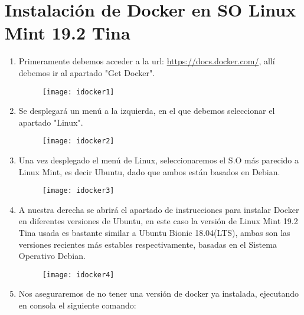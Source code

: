 \documentclass[10pt,letterpaper]{article}
\begin{document}
\newpage
\section{Instalaci\'on de Docker en SO Linux Mint 19.2 Tina}
\begin{enumerate}

\item Primeramente debemos acceder a la url: \url{https://docs.docker.com/}, all\'i debemos ir al apartado "Get Docker". \\

\begin{figure}[h]
\texttt{[image: idocker1]}
\centering
\end{figure}

\item Se desplegar\'a un men\'u a la izquierda, en el que debemos seleccionar el apartado "Linux". \\

\begin{figure}[h]
\texttt{[image: idocker2]}
\centering
\end{figure}

\item Una vez desplegado el men\'u de Linux, seleccionaremos el S.O m\'as parecido a Linux Mint, es decir Ubuntu, dado que ambos est\'an basados en Debian. \\


\begin{figure}[h]
\texttt{[image: idocker3]}
\centering
\end{figure}

\item A nuestra derecha se abrir\'a el apartado de instrucciones para instalar Docker en diferentes versiones de Ubuntu, en este caso la versi\'on de Linux Mint 19.2 Tina usada es bastante similar a Ubuntu Bionic 18.04(LTS), ambas son las versiones recientes m\'as estables respectivamente, basadas en el Sistema Operativo Debian.

\begin{figure}[h]
\texttt{[image: idocker4]}
\centering
\end{figure}

\newpage
\item Nos aseguraremos de no tener una versi\'on de docker ya instalada, ejecutando en consola el siguiente comando: \\


\end{enumerate}
\end{document}
